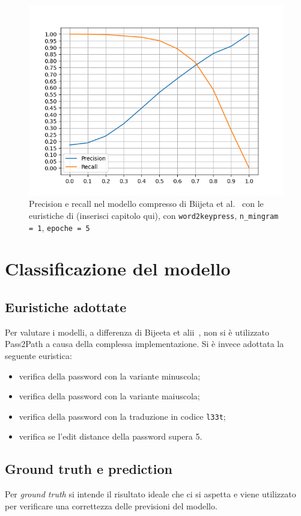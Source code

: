 \begin{figure}[H]
    \centering
    \includegraphics[width=11.5cm]{./immagini/CORRETTO_w2kp_nmingram=1_epochs=5.png}
    \caption{Precision e recall nel modello compresso di Biijeta et al.~\cite{biijeta} con le euristiche di (inserisci capitolo qui), con \texttt{word2keypress}, \texttt{n\_mingram = 1}, \texttt{epoche = 5}}
    \label{primomodello}
\end{figure}

\section{Classificazione del modello}
\label{sec:classificazione modello}
\subsection{Euristiche adottate}
\label{sec:risultati euristiche adottate}
Per valutare i modelli, a differenza di Bijeeta et alii~\cite{biijeta}, non si è utilizzato Pass2Path a causa della complessa implementazione. Si è invece adottata la seguente euristica:
\begin{itemize}
    \item verifica della password con la variante minuscola;
    \item verifica della password con la variante maiuscola;
    \item verifica della password con la traduzione in codice \texttt{l33t};
    \item verifica se l'edit distance della password supera 5.
\end{itemize}

\subsection{Ground truth e prediction}
\label{sec:ground truth e prediction}
Per \emph{ground truth} si intende il risultato ideale che ci si aspetta e viene utilizzato per verificare una correttezza delle previsioni del modello.~\cite{lemoigne2008molecular}

